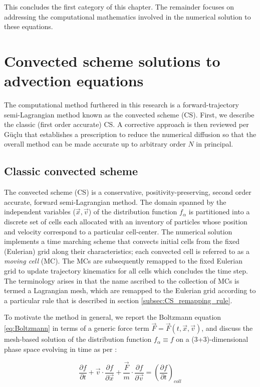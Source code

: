 \documentclass[11pt,titlepage]{report}
\begin{document}
This concludes the first category of this chapter. The remainder focuses on addressing the computational mathematics involved in the numerical solution to these equations.

\section{Convected scheme solutions to advection equations}

The computational method furthered in this research is a forward-trajectory semi-Lagrangian method known as the convected scheme (CS). First, we describe the classic (first order accurate) CS. A corrective approach is then reviewed per G\"u\c{c}lu that establishes a prescription to reduce the numerical diffusion so that the overall method can be made accurate up to arbitrary order $N$ in principal.

\subsection{Classic convected scheme}\label{sec:Classic_convected_scheme}

\indent \indent The convected scheme (CS) is a conservative, positivity-preserving, second order accurate, forward semi-Lagrangian method. The domain spanned by the independent variables ($\vec{x},\vec{v}$) of the distribution function $f_{\alpha}$ is partitioned into a discrete set of cells each allocated with an inventory of particles whose position and velocity correspond to a particular cell-center. The numerical solution implements a time marching scheme that convects initial cells from the fixed (Eulerian) grid along their characteristics; each convected cell is referred to as a \emph{moving cell} (MC). The MCs are subsequently remapped to the fixed Eulerian grid to update trajectory kinematics for all cells which concludes the time step. The terminology arises in that the name ascribed to the collection of MCs is termed a Lagrangian mesh, which are remapped to the Eulerian grid according to a particular rule that is described in section \ref{subsec:CS_remapping_rule}.

To motivate the method in general, we report the Boltzmann equation \eqref{eq:Boltzmann} in terms of a generic force term $\vec{F} = \vec{F}(t,\vec{x},\vec{v})$, and discuss the mesh-based solution of the distribution function $f_{\alpha} \equiv f$ on a (3+3)-dimensional phase space evolving in time as per \cite{Guclu12}:

\begin{equation}
\frac{\partial f}{\partial t} + \vec{v}\cdot \frac{\partial f}{\partial \vec{x}} + \frac{\vec{F}}{m} \cdot \frac{\partial f}{\partial \vec{v}}  =  \left(\frac{\partial f}{\partial t}\right)_{coll} \label{eq:Boltzmann_general}
\end{equation}
\end{document}
